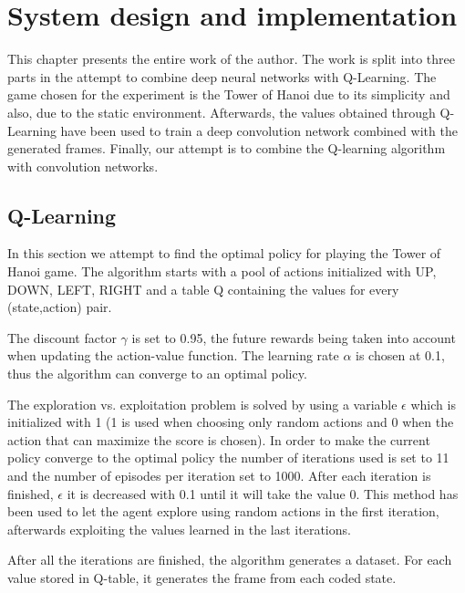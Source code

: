 \chapter{System design and implementation}
\label{chapter:system-design}

This chapter presents the entire work of the author. The work is split into three parts in the attempt to combine deep neural networks with Q-Learning. The game chosen for the  experiment is the Tower of Hanoi due to its simplicity and also, due to the static environment. Afterwards, the values obtained through Q-Learning have been used to train a deep convolution network combined with the generated frames. Finally, our attempt is to combine the Q-learning algorithm with convolution networks.



\section{Q-Learning}
\label{sec:ql}
In this section we attempt to find the optimal policy for playing the Tower of Hanoi game. The algorithm starts with a pool of actions initialized with {UP, DOWN, LEFT, RIGHT} and a table Q containing the values for every (state,action) pair. 

The discount factor $\gamma$ is set to 0.95, the future rewards being taken into account when updating the action-value function. The learning rate $\alpha$ is chosen at 0.1, thus the algorithm can converge to an optimal policy. 

The exploration vs. exploitation problem is solved by using a variable $\epsilon$ which is initialized with 1 (1 is used when choosing only random actions and 0 when the action that can maximize the score is chosen). In order to make the current policy converge to the optimal policy the number of iterations used is set to 11 and the number of episodes per iteration set to 1000. After each iteration is finished, $\epsilon$ it is decreased with 0.1 until it will take the value 0. This method has been used to let the agent explore using random actions in the first iteration, afterwards exploiting the values learned in the last iterations.

After all the iterations are finished, the algorithm generates a dataset. For each value stored in Q-table, it generates the frame from each coded state.

